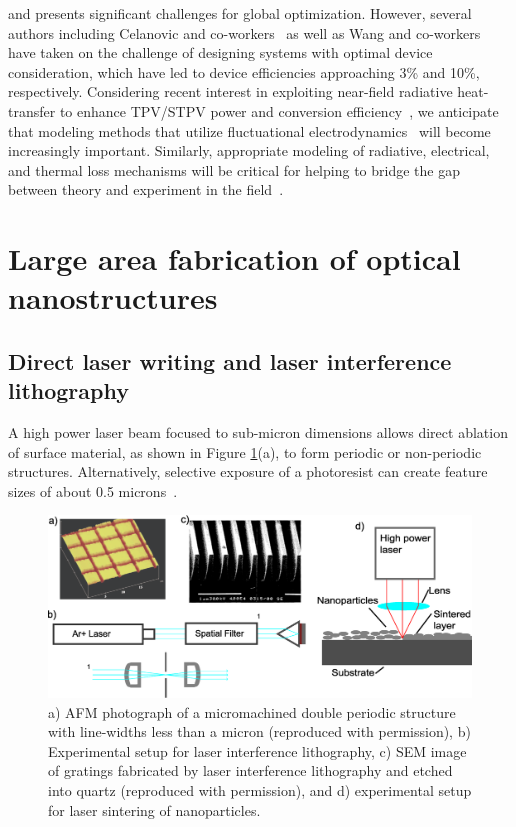 \documentclass[review]{elsarticle}
\begin{document}
and presents significant challenges for global optimization.  
However, several authors including Celanovic and co-workers~\cite{g4}
as well as Wang and co-workers~\cite{g9} have taken on the challenge of designing systems with optimal device consideration, which have led to device efficiencies approaching 3\% and 
10\%, respectively. Considering recent interest in exploiting near-field radiative heat-transfer to enhance
TPV/STPV power and conversion efficiency~\cite{NearFieldConcentrated,SZF_NatNano_2016, KJ_SciRep_2016}, we anticipate that modeling methods that utilize
fluctuational electrodynamics~\cite{rodriguez2011,datas2013,didari2014,didari2015,edalatpour2014} will become increasingly important.
Similarly, appropriate modeling of radiative, electrical, and thermal loss mechanisms will be critical for helping to bridge
the gap between theory and experiment in the field~\cite{BDB_SciRep_2015}.
  
\section{Large area fabrication of optical nanostructures}
\subsection{Direct laser writing and laser interference lithography}
A high power laser beam focused to sub-micron dimensions allows direct 
ablation of surface material,  as shown in Figure \ref{gfig12_comb}(a), to form periodic or non-periodic structures.   Alternatively, selective exposure of a 
photoresist can create feature sizes of about 0.5 microns~\cite{g29}. 

\begin{figure}[ht!]
	\includegraphics[width=\textwidth]{gfig12_comb}
	\caption{\label{gfig12_comb} a) AFM photograph of a micromachined double periodic structure with line-widths less than a micron \cite{g29} (reproduced with permission), b) Experimental setup for laser interference lithography, c) SEM image of gratings fabricated by laser interference lithography and etched into quartz \cite{g30} (reproduced with permission), and d) experimental setup for laser sintering of nanoparticles.} %
\end{figure}
\end{document}
